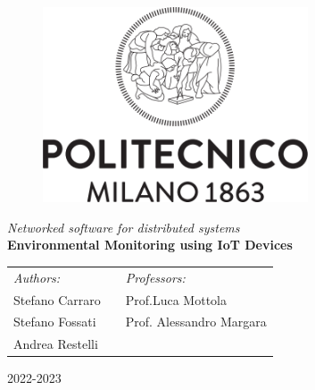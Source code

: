 \begin{titlepage}
\begin{center}
		\begin{figure}[ht]
			\centering\includegraphics[width=0.7\textwidth]{resources/Logo_Politecnico_Milano.png}
		\end{figure}
        
        \vspace{3.5cm}

        \LARGE
        \textit{Networked software for distributed systems}\\

        \vspace{0.5cm}
        \Large
        \textbf{Environmental Monitoring using IoT Devices }
        
        \vspace{\fill}
  
		\large
		\begin{tabularx}{\linewidth}{@{}lXl@{}}
			\textit{Authors:}  & & \textit{Professors:} \\
			Stefano Carraro      & & Prof.\@ Luca Mottola\\
			Stefano Fossati  & & Prof. Alessandro Margara \\
			Andrea Restelli & & \\
		\end{tabularx}		
		\thispagestyle{empty}

        \vspace{1cm}

        2022-2023
           
\end{center}
\end{titlepage}